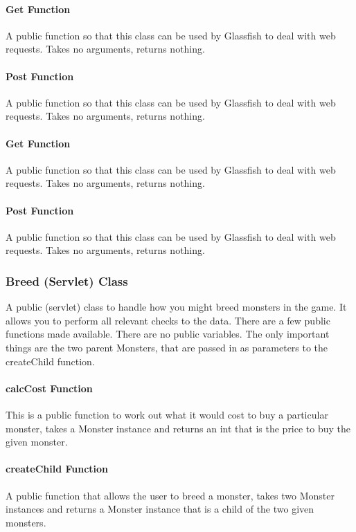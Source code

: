 \documentclass[titlepage]{article}
\begin{document}
\paragraph{Get Function}
A public function so that this class can be used by Glassfish to deal with web requests. Takes no arguments, returns nothing.

\paragraph{Post Function}
A public function so that this class can be used by Glassfish to deal with web requests. Takes no arguments, returns nothing.

\paragraph{Get Function}
A public function so that this class can be used by Glassfish to deal with web requests. Takes no arguments, returns nothing.

\paragraph{Post Function}
A public function so that this class can be used by Glassfish to deal with web requests. Takes no arguments, returns nothing.

\subsubsection{Breed (Servlet) Class}
A public (servlet) class to handle how you might breed monsters in the game. It allows you to perform all relevant checks to the data. There are a few public functions made available. There are no public variables. The only important things are the two parent Monsters, that are passed in as parameters to the createChild function. 

\paragraph{calcCost Function}
This is a public function to work out what it would cost to buy a particular monster, takes a Monster instance and returns an int that is the price to buy the given monster.

\paragraph{createChild Function}
A public function that allows the user to breed a monster, takes two Monster instances and returns a Monster instance that is a child of the two given monsters.
\end{document}
